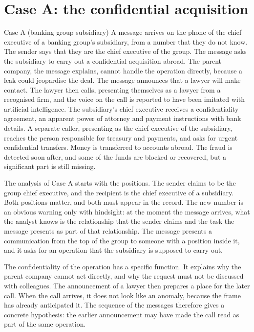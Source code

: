 \section{Case A: the confidential acquisition}

\begin{casehistory}{Case A (banking group subsidiary)}
	A message arrives on the phone of the chief executive of a banking group's subsidiary, from a number that they do not know. The sender says that they are the chief executive of the group. The message asks the subsidiary to carry out a confidential acquisition abroad. The parent company, the message explains, cannot handle the operation directly, because a leak could jeopardise the deal. The message announces that a lawyer will make contact. The lawyer then calls, presenting themselves as a lawyer from a recognised firm, and the voice on the call is reported to have been imitated with artificial intelligence. The subsidiary's chief executive receives a confidentiality agreement, an apparent power of attorney and payment instructions with bank details. A separate caller, presenting as the chief executive of the subsidiary, reaches the person responsible for treasury and payments, and asks for urgent confidential transfers. Money is transferred to accounts abroad. The fraud is detected soon after, and some of the funds are blocked or recovered, but a significant part is still missing.
\end{casehistory}

The analysis of Case A starts with the positions. The sender claims to be the group chief executive, and the recipient is the chief executive of a subsidiary. Both positions matter, and both must appear in the record. The new number is an obvious warning only with hindsight: at the moment the message arrives, what the analyst knows is the relationship that the sender claims and the task the message presents as part of that relationship. The message presents a communication from the top of the group to someone with a position inside it, and it asks for an operation that the subsidiary is supposed to carry out.

The confidentiality of the operation has a specific function. It explains why the parent company cannot act directly, and why the request must not be discussed with colleagues. The announcement of a lawyer then prepares a place for the later call. When the call arrives, it does not look like an anomaly, because the frame has already anticipated it. The sequence of the messages therefore gives a concrete hypothesis: the earlier announcement may have made the call read as part of the same operation.


